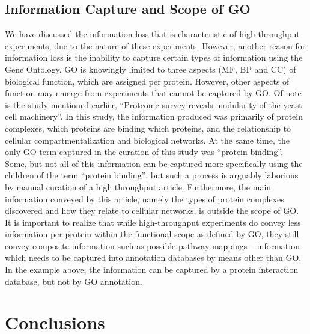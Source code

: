 \documentclass[12pt]{article}
\begin{document}
\subsection*{Information Capture and Scope of GO}

We have discussed the information loss that is characteristic of high-throughput
experiments, due to the nature of these experiments. However, another reason for information loss
is the inability to capture certain types of information using the Gene Ontology. GO is knowingly
limited to three aspects (MF, BP and CC) of biological function, which are assigned per protein.
However, other aspects of function may emerge from experiments that cannot be captured by GO.  Of
note is the study mentioned earlier, ``Proteome survey reveals modularity of the yeast cell
machinery''\cite{pmid18029348}.  In this study, the information produced was primarily of protein
complexes, which proteins are binding which proteins, and the relationship to cellular
compartmentalization and biological networks. At the same time, the only GO-term captured in the
curation of this study was ``protein binding''.  Some, but not all of this information can be
captured more specifically using the children of the term ``protein binding'', but such a process
is arguably laborious by manual curation of a high throughput article.  Furthermore, the main
information conveyed by this article, namely the types of protein complexes discovered and how they
relate to cellular networks, is outside the scope of GO. It is important to realize that while
high-throughput experiments do convey less information per protein within the functional scope as
defined by GO, they still convey composite information such as possible pathway mappings --
information which needs to be captured into annotation databases by means other than GO.  In the
example above, the information can be captured by a protein interaction database, but not by GO
annotation.

\section*{Conclusions}
\end{document}
